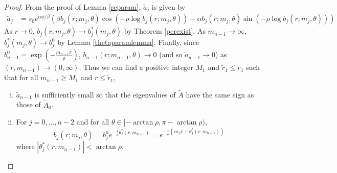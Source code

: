 \documentclass[thesis.tex]{subfiles}
\begin{document}
\begin{lemma}
\begin{proof}
From the proof of Lemma \eqref{reparam}, $\tilde{a}_j$ is given by
\begin{align}\label{tildeaj2}
\tilde{a}_j
&= s_0 e^{\alpha \phi/\beta} \left( \beta b_j(r; m_j, \theta) \cos\left( -\rho \log b_j(r; m_j, \theta) \right) - \alpha b_j(r; m_j, \theta) \sin \left( -\rho \log b_j(r; m_j, \theta) \right) \right)
\end{align}
As $r \rightarrow 0$, $b_j(r; m_j, \theta) \rightarrow b_j^*(m_j, \theta)$ by Theorem \ref{perexist}. As $m_{n-1} \rightarrow \infty$, $b_j^*(m_j, \theta) \rightarrow b_j^0$ by Lemma \ref{thetaparamlemma}. Finally, since $b_{n-1}^0 = \exp\left(-\frac{m_{n-1} \pi}{\rho}\right)$, $b_{n-1}(r; m_{n-1}, \theta) \rightarrow 0$ (and so $\tilde{a}_{n-1} \rightarrow 0$) as $(r, m_{n-1}) \rightarrow (0, \infty)$. Thus we can find a positive integer $M_1$ and $\tilde{r}_1 \leq r_1$ such that for all $m_{n-1} \geq M_1$ and $r \leq \tilde{r}_1$, 
\begin{enumerate}[(i)]
	\item $\tilde{a}_{n-1}$ is sufficiently small so that the eigenvalues of $\tilde{A}$ have the same sign as those of $\tilde{A}_0$.
	\item For $j = 0, \dots, n-2$ and for all $\theta \in [-\arctan \rho, \pi - \arctan \rho)$,
	\begin{equation}\label{bjunif}
	b_j(r; m_j, \theta) = b_j^0 e^{ -\frac{1}{\rho} \theta^*_j(r, m_{n-1}) } = e^{ -\frac{1}{\rho}(m_j \pi + \theta^*_j(r, m_{n-1})) } 
	\end{equation}
	where $|\theta^*_j(r, m_{n-1})| < \arctan \rho$.
\end{enumerate}


\end{proof}
\end{lemma}
\end{document}
